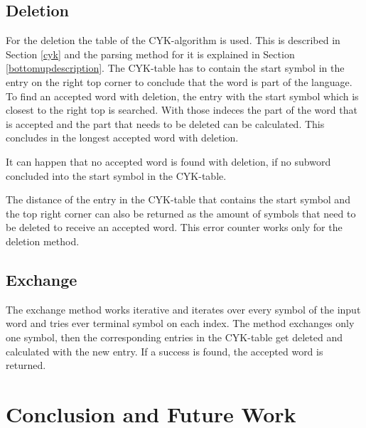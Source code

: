 \documentclass[a4paper, 11pt]{article}
\begin{document}
\subsection{Deletion}
\label{deletion}

For the deletion the table of the CYK-algorithm is used. This is described in Section \ref{cyk} and the parsing method for it is explained in Section \ref{bottomupdescription}.
The CYK-table has to contain the start symbol in the entry on the right top corner to conclude that the word is part of the language. To find an accepted word with deletion, the entry with the start symbol which is closest to the right top is searched. With those indeces the part of the word that is accepted and the part that needs to be deleted can be calculated. This concludes in the longest accepted word with deletion.

It can happen that no accepted word is found with deletion, if no subword concluded into the start symbol in the CYK-table.

The distance of the entry in the CYK-table that contains the start symbol and the top right corner can also be returned as the amount of symbols that need to be deleted to receive an accepted word. This error counter works only for the deletion method.








\subsection{Exchange}
\label{exchange}

The exchange method works iterative and iterates over every symbol of the input word and tries ever terminal symbol on each index. The method exchanges only one symbol, then the corresponding entries in the CYK-table get deleted and calculated with the new entry. If a success is found, the accepted word is returned. 
















\newpage

\section{Conclusion and Future Work}
\label{conclusion}
\end{document}
